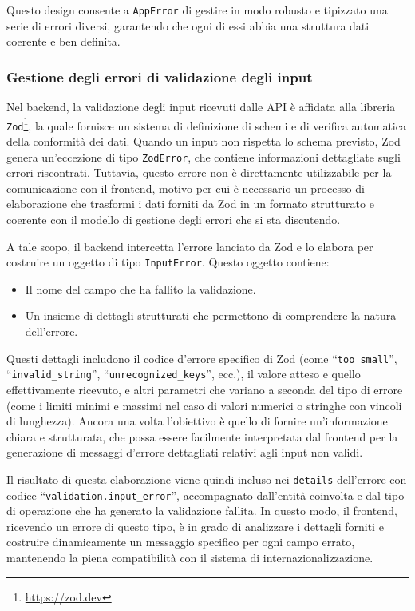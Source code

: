 Questo design consente a \texttt{AppError} di gestire in modo robusto e tipizzato una serie di errori diversi, garantendo che ogni di essi abbia una struttura dati coerente e ben definita.

\subsubsection{Gestione degli errori di validazione degli input}\label{sec:input-validation-errors}
Nel backend, la validazione degli input ricevuti dalle API è affidata alla libreria \texttt{Zod}\footnote{\url{https://zod.dev}}, la quale fornisce un sistema di definizione di schemi e di verifica automatica della conformità dei dati. Quando un input non rispetta lo schema previsto, Zod genera un'eccezione di tipo \texttt{ZodError}, che contiene informazioni dettagliate sugli errori riscontrati. Tuttavia, questo errore non è direttamente utilizzabile per la comunicazione con il frontend, motivo per cui è necessario un processo di elaborazione che trasformi i dati forniti da Zod in un formato strutturato e coerente con il modello di gestione degli errori che si sta discutendo.

A tale scopo, il backend intercetta l’errore lanciato da Zod e lo elabora per costruire un oggetto di tipo \texttt{InputError}. Questo oggetto contiene:
\begin{itemize}
  \item Il nome del campo che ha fallito la validazione.
  \item Un insieme di dettagli strutturati che permettono di comprendere la natura dell'errore.
\end{itemize}
Questi dettagli includono il codice d'errore specifico di Zod (come ``\texttt{too\_small}'', ``\texttt{invalid\_string}'', ``\texttt{unrecognized\_keys}'', ecc.), il valore atteso e quello effettivamente ricevuto, e altri parametri che variano a seconda del tipo di errore (come i limiti minimi e massimi nel caso di valori numerici o stringhe con vincoli di lunghezza). Ancora una volta l'obiettivo è quello di fornire un’informazione chiara e strutturata, che possa essere facilmente interpretata dal frontend per la generazione di messaggi d’errore dettagliati relativi agli input non validi.

Il risultato di questa elaborazione viene quindi incluso nei \texttt{details} dell’errore con codice ``\texttt{validation.input\_error}'', accompagnato dall’entità coinvolta e dal tipo di operazione che ha generato la validazione fallita. In questo modo, il frontend, ricevendo un errore di questo tipo, è in grado di analizzare i dettagli forniti e costruire dinamicamente un messaggio specifico per ogni campo errato, mantenendo la piena compatibilità con il sistema di internazionalizzazione.

